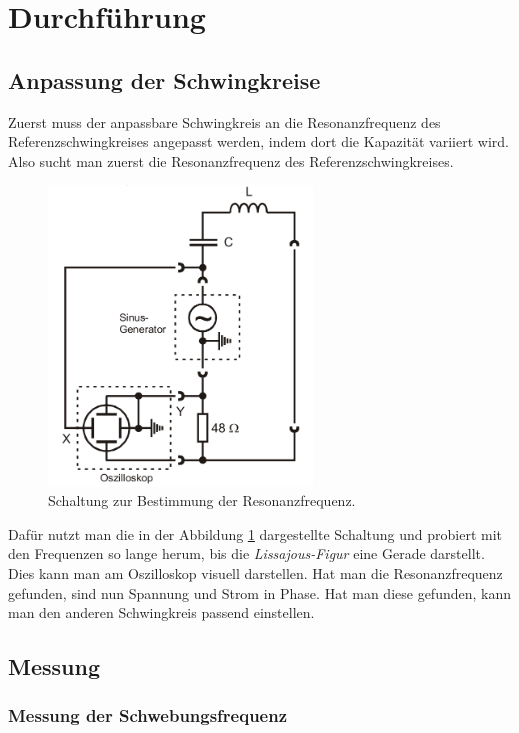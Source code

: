 \newpage
\section{Durchführung}
\label{sec:Durchführung}


\subsection{Anpassung der Schwingkreise}

Zuerst muss der anpassbare Schwingkreis an die Resonanzfrequenz des Referenzschwingkreises angepasst werden, indem dort die Kapazität variiert wird.
Also sucht man zuerst die Resonanzfrequenz des Referenzschwingkreises.

\begin{figure} 
    \centering
    \includegraphics[width=7cm] {pictures/messschaltung.png} 
    \caption{Schaltung zur Bestimmung der Resonanzfrequenz. \cite{v355}}
    \label{fig:messschaltung}
\end{figure} 

Dafür nutzt man die in der Abbildung \ref{fig:messschaltung} dargestellte Schaltung und probiert mit den Frequenzen so lange herum,
bis die \textit{Lissajous-Figur} eine Gerade darstellt. Dies kann man am  Oszilloskop visuell darstellen.
Hat man die Resonanzfrequenz gefunden, sind nun Spannung und Strom in Phase.
Hat man diese gefunden, kann man den anderen Schwingkreis passend einstellen.


\subsection{Messung}
\subsubsection*{Messung der Schwebungsfrequenz}

